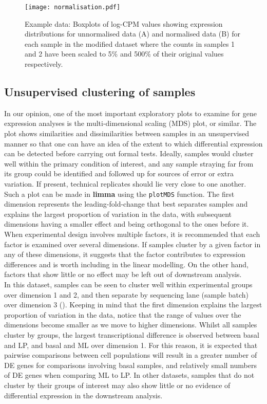 \documentclass[10pt,a4paper]{extarticle}\usepackage[]{graphicx}\usepackage[]{color}
\begin{document}
\begin{figure}
\centering
\texttt{[image: normalisation.pdf]}
\caption{\label{fig:normalisation}Example data: Boxplots of log-CPM values showing expression distributions for unnormalised data (A) and normalised data (B) for each sample in the modified dataset where the counts in samples 1 and 2 have been scaled to 5\% and 500\% of their original values respectively.}
\end{figure}


\subsection*{Unsupervised clustering of samples}
In our opinion, one of the most important exploratory plots to examine for gene expression analyses is the multi-dimensional scaling (MDS) plot, or similar. The plot shows similarities and dissimilarities between samples in an unsupervised manner so that one can have an idea of the extent to which differential expression can be detected before carrying out formal tests. Ideally, samples would cluster well within the primary condition of interest, and any sample straying far from its group could be identified and followed up for sources of error or extra variation. If present, technical replicates should lie very close to one another. \\

Such a plot can be made in \textbf{limma} using the \texttt{plotMDS} function. The first dimension represents the leading-fold-change that best separates samples and explains the largest proportion of variation in the data, with subsequent dimensions having a smaller effect and being orthogonal to the ones before it. When experimental design involves multiple factors, it is recommended that each factor is examined over several dimensions. If samples cluster by a given factor in any of these dimensions, it suggests that the factor contributes to expression differences and is worth including in the linear modelling. On the other hand, factors that show little or no effect may be left out of downstream analysis.\\

In this dataset, samples can be seen to cluster well within experimental groups over dimension 1 and 2, and then separate by sequencing lane (sample batch) over dimension 3 ({}). 
Keeping in mind that the first dimension explains the largest proportion of variation in the data, notice that the range of values over the dimensions become smaller as we move to higher dimensions.
Whilst all samples cluster by groups, the largest transcriptional difference is observed between basal and LP, and basal and ML over dimension 1. 
For this reason, it is expected that pairwise comparisons between cell populations will result in a greater number of DE genes for comparisons involving basal samples, and relatively small numbers of DE genes when comparing ML to LP. In other datasets, samples that do not cluster by their groups of interest may also show little or no evidence of differential expression in the downstream analysis.\\ 
\end{document}
